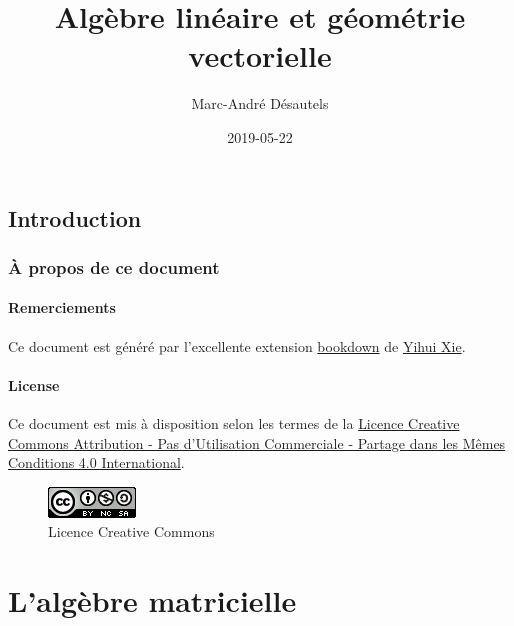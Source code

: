 \documentclass[]{book}
\title{Algèbre linéaire et géométrie vectorielle}
\author{Marc-André Désautels}
\date{2019-05-22}
\theoremstyle{definition}
\theoremstyle{definition}
\theoremstyle{definition}
\theoremstyle{remark}
\begin{document}
\maketitle

{
\setcounter{tocdepth}{2}
\tableofcontents
}
\hypertarget{introduction}{%
\chapter*{Introduction}\label{introduction}}

\hypertarget{a-propos-de-ce-document}{%
\section*{À propos de ce document}\label{a-propos-de-ce-document}}

\hypertarget{remerciements}{%
\subsection*{Remerciements}\label{remerciements}}

Ce document est généré par l'excellente extension \href{https://bookdown.org/}{bookdown} de \href{https://yihui.name/}{Yihui Xie}.

\hypertarget{license}{%
\subsection*{License}\label{license}}

Ce document est mis à disposition selon les termes de la \href{http://creativecommons.org/licenses/by-nc-sa/4.0/}{Licence Creative Commons Attribution - Pas d'Utilisation Commerciale - Partage dans les Mêmes Conditions 4.0 International}.

\begin{figure}
\centering
\includegraphics{resources/icons/license_cc.png}
\caption{Licence Creative Commons}
\end{figure}

\hypertarget{part-lalgebre-matricielle}{%
\part{L'algèbre matricielle}\label{part-lalgebre-matricielle}}
\end{document}
